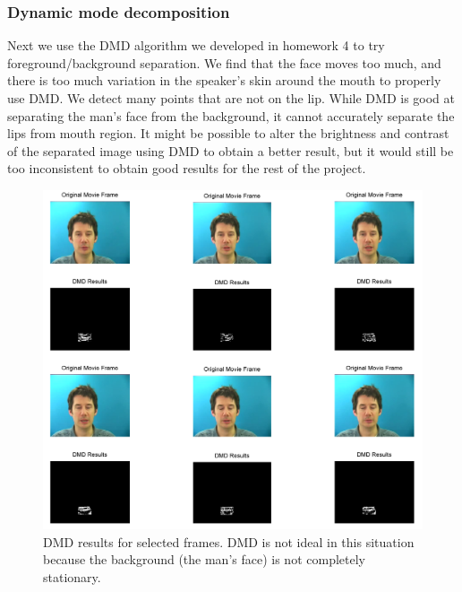 \documentclass[a4paper]{article}
\begin{document}
\subsubsection{Dynamic mode decomposition}
Next we use the DMD algorithm we developed in homework 4 to try foreground/background separation. We find that the face moves too much, and there is too much variation in the speaker's skin around the mouth to properly use DMD. We detect many points that are not on the lip. While DMD is good at separating the man's face from the background, it cannot accurately separate the lips from mouth region. It might be possible to alter the brightness and contrast of the separated image using DMD to obtain a better result, but it would still be too inconsistent to obtain good results for the rest of the project. \par

\begin{figure}[!ht]
	\includegraphics[width=1\textwidth, height=0.75\textwidth]{DMD1.png}
	\caption{DMD results for selected frames. DMD is not ideal in this situation because the background (the man's face) is not completely stationary.}
\end{figure}
\end{document}
